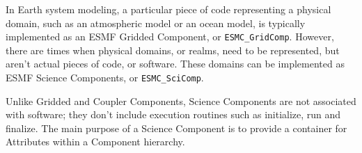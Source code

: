 %


\label{sec:SciComp}

In Earth system modeling, a particular piece of code representing a physical 
domain, such as an atmospheric model or an ocean model, is typically 
implemented as an ESMF Gridded Component, or {\tt ESMC\_GridComp}.  
However, there are times when physical domains, or realms, need to be 
represented, but aren't actual pieces of code, or software.  These domains 
can be implemented as ESMF Science Components, or {\tt ESMC\_SciComp}.

Unlike Gridded and Coupler Components, Science Components are not associated 
with software; they don't include execution routines such as initialize, 
run and finalize.  The main purpose of a Science Component 
is to provide a container for Attributes within a Component hierarchy. 

